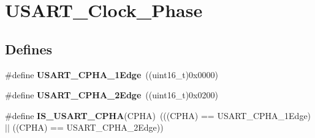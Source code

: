 \hypertarget{group__USART__Clock__Phase}{
\section{USART\_\-Clock\_\-Phase}
\label{group__USART__Clock__Phase}
}
\subsection*{Defines}
\begin{DoxyCompactItemize}
\item 
\hypertarget{group__USART__Clock__Phase_gab6c0fb052fb9bc418cf368c1a0e4643b}{
\#define {\bfseries USART\_\-CPHA\_\-1Edge}~((uint16\_\-t)0x0000)}
\label{group__USART__Clock__Phase_gab6c0fb052fb9bc418cf368c1a0e4643b}

\item 
\hypertarget{group__USART__Clock__Phase_ga66344d0725f1300e9d0f8f1708111f25}{
\#define {\bfseries USART\_\-CPHA\_\-2Edge}~((uint16\_\-t)0x0200)}
\label{group__USART__Clock__Phase_ga66344d0725f1300e9d0f8f1708111f25}

\item 
\hypertarget{group__USART__Clock__Phase_ga66fa1a3a757025fcd8dd069a90689f88}{
\#define {\bfseries IS\_\-USART\_\-CPHA}(CPHA)~(((CPHA) == USART\_\-CPHA\_\-1Edge) $|$$|$ ((CPHA) == USART\_\-CPHA\_\-2Edge))}
\label{group__USART__Clock__Phase_ga66fa1a3a757025fcd8dd069a90689f88}

\end{DoxyCompactItemize}

